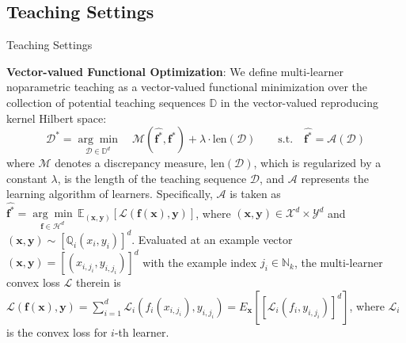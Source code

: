 \documentclass[aspectratio=169,xcolor=dvipsnames]{beamer}
\begin{document}
\subsection{Teaching Settings}
\begin{frame}{Teaching Settings}

{\bf \color{blue} Vector-valued Functional Optimization}: We define multi-learner noparametric teaching as a \alert{vector-valued functional minimization} over the collection of potential teaching sequences $\mathbb{D}$ in the vector-valued reproducing kernel Hilbert space:
\begin{equation}\label{eq1}
\bm{\mathcal{D}}^*=\underset{\bm{\mathcal{D}}\in\mathbb{D}^d}{\arg\min}\quad \mathcal{M}(\hat{\bm{f}^*},\bm{f}^*)+\lambda\cdot \text{len}(\bm{\mathcal{D}}) \qquad \text{s.t.}\quad\hat{\bm{f}^*}=\mathcal{A}(\bm{\mathcal{D}})
\end{equation}
where $\mathcal{M}$ denotes a discrepancy measure, $\text{len}(\bm{\mathcal{D}})$, 
which is regularized by a constant $\lambda$, is the length of the teaching sequence $\bm{\mathcal{D}}$, and $\mathcal{A}$ represents the learning algorithm of learners. Specifically, $\mathcal{A}$ is taken as $\hat{\bm{f}^*}=\underset {\bm{f}\in\mathcal{H}^d}{\arg\min}\,\mathbb{E}_{(\bm{x},\bm{y})}\left[\mathcal{L}(\bm{f}(\bm{x}),\bm{y})\right]$,
where $(\bm{x},\bm{y})\in\mathcal{X}^d\times\mathcal{Y}^d$ and $(\bm{x},\bm{y})\sim[\mathbb{Q}_i(x_i,y_i)]^d$. Evaluated at an example vector $(\bm{x},\bm{y})=[(x_{i,j_i},y_{i,j_i})]^d$ with the example index $j_i\in\mathbb{N}_k$, the \alert{multi-learner convex} loss $\mathcal{L}$ therein is
$\mathcal{L}(\bm{f}(\bm{x}),\bm{y})=\sum_{i=1}^d \mathcal{L}_i(f_i(x_{i,j_i}),y_{i,j_i})=E_{\bm{x}}\left[[\mathcal{L}_i(f_i,y_{i,j_i})]^d\right]$, where $\mathcal{L}_i$ is the \alert{convex} loss for $i$-th learner.
\end{frame}
\end{document}
